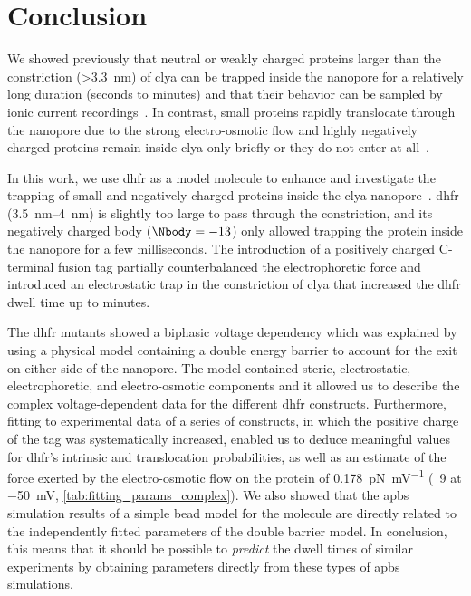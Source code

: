 %
\section{Conclusion}
%
\label{sec:trapping:conclusion}
%
We showed previously that neutral or weakly charged proteins larger than the \transi{} constriction
(\SI{>3.3}{\nm}) of \gls{clya} can be trapped inside the nanopore for a relatively long duration (seconds to
minutes) and that their behavior can be sampled by ionic current recordings~\cite{Soskine-2013,
Soskine-2012,Soskine-Biesemans-2015,Biesemans-2015,VanMeervelt-2014,VanMeervelt-2017,Wloka-2017}. In contrast,
small proteins rapidly translocate through the nanopore due to the strong electro-osmotic flow and highly
negatively charged proteins remain inside \gls{clya} only briefly or they do not enter at
all~\cite{Soskine-2012}.

In this work, we use \gls{dhfr} as a model molecule to enhance and investigate the trapping of small and
negatively charged proteins inside the \gls{clya} nanopore~\cite{Biesemans-2015}. \gls{dhfr}
(\SIrange{3.5}{4}{\nm}) is slightly too large to pass through the \transi{} constriction, and its negatively
charged body ($\Nbody = -13$) only allowed trapping the protein inside the nanopore for a few milliseconds.
The introduction of a positively charged C-terminal fusion tag partially counterbalanced the electrophoretic
force and introduced an electrostatic trap in the \transi{} constriction of \gls{clya} that increased the
\gls{dhfr} dwell time up to minutes.

The \gls{dhfr} mutants showed a biphasic voltage dependency which was explained by using a physical model
containing a double energy barrier to account for the exit on either side of the nanopore. The model contained
steric, electrostatic, electrophoretic, and electro-osmotic components and it allowed us to describe the
complex voltage-dependent data for the different \gls{dhfr} constructs. Furthermore, fitting to experimental
data of a series of  constructs, in which the positive charge of the tag was systematically
increased, enabled us to deduce meaningful values for \gls{dhfr}'s intrinsic \cisi{} and \transi{}
translocation probabilities, as well as an estimate of the force exerted by the electro-osmotic flow on the
protein of \SI{0.178}{\pico\newton\per\milli\volt} (\eg~\SI{9}{\pN} at \SI{-50}{\mV},
\cref{tab:fitting_params_complex}). We also showed that the \gls{apbs} simulation results of a simple bead
model for the molecule are directly related to the independently fitted parameters of the double barrier
model. In conclusion, this means that it should be possible to \emph{predict} the dwell times of similar
experiments by obtaining parameters directly from these types of \gls{apbs} simulations.

